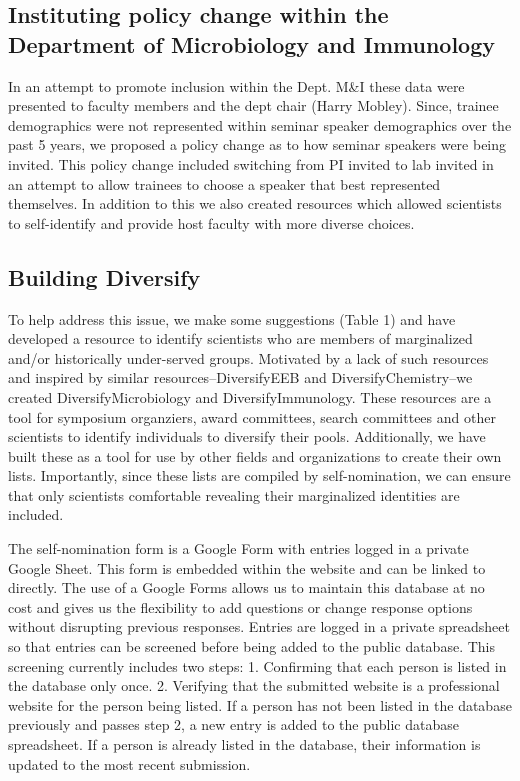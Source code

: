 \documentclass[10pt,]{article}
\begin{document}
\subsection{Instituting policy change within the Department of
Microbiology and
Immunology}\label{instituting-policy-change-within-the-department-of-microbiology-and-immunology}

In an attempt to promote inclusion within the Dept. M\&I these data were
presented to faculty members and the dept chair (Harry Mobley). Since,
trainee demographics were not represented within seminar speaker
demographics over the past 5 years, we proposed a policy change as to
how seminar speakers were being invited. This policy change included
switching from PI invited to lab invited in an attempt to allow trainees
to choose a speaker that best represented themselves. In addition to
this we also created resources which allowed scientists to self-identify
and provide host faculty with more diverse choices.

\subsection{Building Diversify}\label{building-diversify}

To help address this issue, we make some suggestions (Table 1) and have
developed a resource to identify scientists who are members of
marginalized and/or historically under-served groups. Motivated by a
lack of such resources and inspired by similar resources--DiversifyEEB
and DiversifyChemistry--we created DiversifyMicrobiology and
DiversifyImmunology. These resources are a tool for symposium
organziers, award committees, search committees and other scientists to
identify individuals to diversify their pools. Additionally, we have
built these as a tool for use by other fields and organizations to
create their own lists. Importantly, since these lists are compiled by
self-nomination, we can ensure that only scientists comfortable
revealing their marginalized identities are included.

The self-nomination form is a Google Form with entries logged in a
private Google Sheet. This form is embedded within the website and can
be linked to directly. The use of a Google Forms allows us to maintain
this database at no cost and gives us the flexibility to add questions
or change response options without disrupting previous responses.
Entries are logged in a private spreadsheet so that entries can be
screened before being added to the public database. This screening
currently includes two steps: 1. Confirming that each person is listed
in the database only once. 2. Verifying that the submitted website is a
professional website for the person being listed. If a person has not
been listed in the database previously and passes step 2, a new entry is
added to the public database spreadsheet. If a person is already listed
in the database, their information is updated to the most recent
submission.
\end{document}
